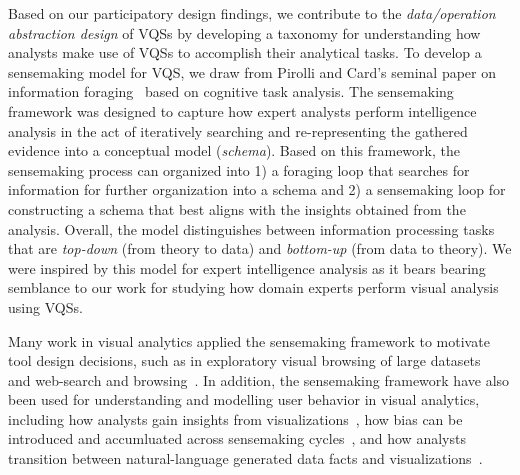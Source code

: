 {  %
  \par {}
  \npar Based on our participatory design findings, we contribute to the \textit{data/operation abstraction design} of VQSs by developing a taxonomy for understanding how analysts make use of VQSs to accomplish their analytical tasks. To develop a sensemaking model for VQS, we draw from Pirolli and Card's seminal paper on information foraging~\cite{Pirolli} based on cognitive task analysis. The sensemaking framework was designed to capture how expert analysts perform intelligence analysis in the act of iteratively searching and re-representing the gathered evidence into a conceptual model (\emph{schema}). Based on this framework, the sensemaking process can organized into 1) a foraging loop that searches for information for further organization into a schema and 2) a sensemaking loop for constructing a schema that best aligns with the insights obtained from the analysis. Overall, the model distinguishes between information processing tasks that are \textit{top-down} (from theory to data) and \textit{bottom-up} (from data to theory). We were inspired by this model for expert intelligence analysis as it bears bearing semblance to our work for studying how domain experts perform visual analysis using VQSs.
  \par Many work in visual analytics applied the sensemaking framework to motivate tool design decisions, such as in exploratory visual browsing of large datasets~\cite{Battle2016} and web-search and browsing~\cite{Olston2003}. In addition, the sensemaking framework have also been used for understanding and modelling user behavior in visual analytics, including how analysts gain insights from visualizations~\cite{Yi2008}, how bias can be introduced and accumluated across sensemaking cycles~\cite{Wall2017}, and how analysts transition between natural-language generated data facts and visualizations~\cite{Srinivasan2019}.
}
